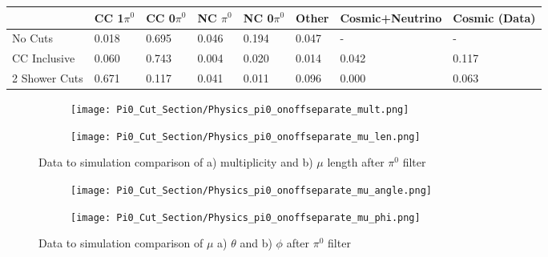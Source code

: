 \begin{table}[H]
\centering
{}
 \begin{tabular}{| l | l | l |l|l|l|l|l|}
 \hline
  & CC 1$\pi^0$ & CC 0$\pi^0$ & NC $\pi^0$ & NC 0$\pi^0$ & Other& Cosmic+Neutrino& Cosmic (Data) \\ [0.1ex] \hline
No Cuts  & 0.018 &  0.695 & 0.046 & 0.194  & 0.047 & -&-\\
CC Inclusive & 0.060 & 0.743 & 0.004 & 0.020 & 0.014 & 0.042 & 0.117  \\ 
2 Shower Cuts  & 0.671 & 0.117 & 0.041 & 0.011 & 0.096 & 0.000 & 0.063 \\ \hline
\end{tabular}
\end{table}

\begin{figure}[H]
\centering
  \begin{subfigure}[t]{0.3\textwidth}
    \centering
\texttt{[image: Pi0\_Cut\_Section/Physics\_pi0\_onoffseparate\_mult.png]}
  \caption{ }
  \end{subfigure} 
  \hspace{10mm}
  \begin{subfigure}[t]{0.3\textwidth}
    \centering
    \texttt{[image: Pi0\_Cut\_Section/Physics\_pi0\_onoffseparate\_mu\_len.png]}
  \caption{ }
  \end{subfigure} 
  \caption{ Data to simulation comparison of a) multiplicity and b) $\mu$ length after $\pi^0$ filter }
\label{fig:physics_pi0_mu_len}
\end{figure}

\begin{figure}[H]
\centering
  \begin{subfigure}[t]{0.3\textwidth}
    \centering
\texttt{[image: Pi0\_Cut\_Section/Physics\_pi0\_onoffseparate\_mu\_angle.png]}
  \caption{ }
  \end{subfigure} 
  \hspace{10mm}
  \begin{subfigure}[t]{0.3\textwidth}
    \centering
\texttt{[image: Pi0\_Cut\_Section/Physics\_pi0\_onoffseparate\_mu\_phi.png]}
  \caption{ }
  \end{subfigure} 
\caption{ Data to simulation comparison of $\mu$ a) $\theta$ and b) $\phi$ after $\pi^0$ filter }

\label{fig:physics_pi0_mu_phi}
\end{figure}

